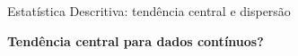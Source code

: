 \documentclass{beamer}\usepackage[]{graphicx}\usepackage[]{color}
\begin{document}
\begin{frame}{Estatística Descritiva: tendência central e dispersão}
\linespread{1.5} 
 
\textbf{Tendência central para dados contínuos?}

\begin{columns}[c]


\begin{itemize}
\end{itemize}



% 
% 
% 

\end{columns}

\end{frame} 
\end{document}
